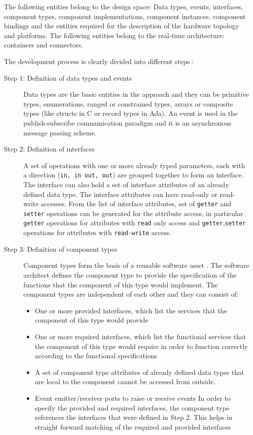 The following entities belong to the design space: Data types, events, interfaces, component types, component implementations, component instances, component bindings and the entities required for the description of the hardware topology and platforms. The following entities belong to the real-time architecture: containers and connectors.

The development process is clearly divided into different steps \cite{CompBasedProcess} \cite{PhdThesis} \cite{SAVOIR}:

\begin{description}
\item [Step 1: Definition of data types and events] Data types are the basic entities in the approach and they can be primitive types, enumerations, ranged or constrained types, arrays or composite types (like structs in C or record types in Ada). An event is used in the publish-subscribe communication paradigm and it is an asynchronous message passing scheme.

\item [Step 2: Definition of interfaces] A set of operations with one or more already typed parameters, each with a direction (\texttt{in, in out, out}) are grouped together to form an interface. The interface can also hold a set of interface attributes of an already defined data type. The interface attributes can have read-only or read-write accesses. From the list of interface attributes, set of \texttt{getter} and \texttt{setter} operations can be generated for the attribute access, in particular \texttt{getter} operations for attributes with \texttt{read} only access and \texttt{getter},\texttt{setter} operations for attributes with \texttt{read-write} access. 

\item [Step 3: Definition of component types] Component types form the basis of a reusable software asset \cite{CompBasedProcess}. The software architect defines the component type to provide the specification of the functions that the component of this type would implement. The component types are independent of each other and they can consist of:
\begin{itemize}
\item One or more provided interfaces, which list the services that the component of this type would provide
\item One or more required interfaces, which list the functional services that the component of this type would require in order to function correctly according to the functional specifications
\item A set of component type attributes of already defined data types that are local to the component cannot be accessed from outside.
\item Event emitter/receiver ports to raise or receive events
In order to specify the provided and required interfaces, the component type references the interfaces that were defined in Step 2. This helps in straight forward matching of the required and provided interfaces  
\end{itemize}


\end{description}
